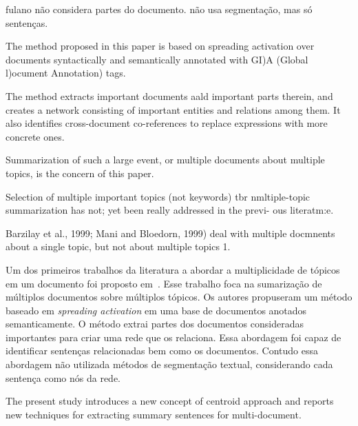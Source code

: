 

fulano não considera partes do documento. 
não usa segmentação, mas só sentenças.



The method proposed in this paper is
based on spreading activation over documents
syntactically and semantically annotated with
GI)A (Global l)ocument Annotation) tags.
 
The method extracts important documents aald 
important parts therein, and creates a network
consisting of important entities and relations
among them. It also identifies cross-document
co-references to replace expressions with more
concrete ones.



Summarization of such a large event, or multiple 
documents about multiple topics, is the
concern of this paper.


Selection of multiple important topics (not
keywords) tbr nmltiple-topic summarization has
not; yet been really addressed in the previ-
ous literatm:e.

 
Barzilay et al., 1999; Mani and Bloedorn, 1999) deal with multiple docmnents about a single topic, but not about multiple topics 1.  




Um dos primeiros trabalhos da literatura a abordar a multiplicidade de tópicos em um documento foi proposto em~\cite{}. Esse trabalho foca na sumarização de múltiplos documentos sobre múltiplos tópicos. Os autores propuseram um método baseado em \textit{spreading activation} em uma base de documentos anotados semanticamente. O método extrai partes dos documentos consideradas importantes para criar uma rede que os relaciona. Essa abordagem foi capaz de identificar sentenças relacionadas bem como os documentos. Contudo essa abordagem não utilizada métodos de segmentação textual, considerando cada sentença como nós da rede. 











The present study introduces a new concept of centroid approach and reports new techniques for extracting summary sentences for multi-document.


